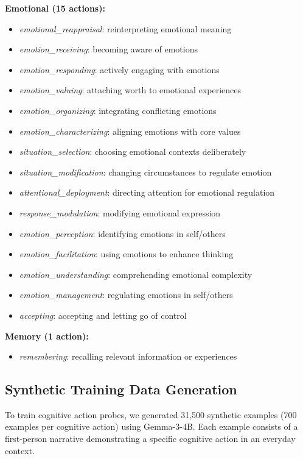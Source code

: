 \documentclass[letterpaper]{article}
\begin{document}
\textbf{Emotional (15 actions):}
\begin{itemize}
    \item \textit{emotional\_reappraisal}: reinterpreting emotional meaning
    \item \textit{emotion\_receiving}: becoming aware of emotions
    \item \textit{emotion\_responding}: actively engaging with emotions
    \item \textit{emotion\_valuing}: attaching worth to emotional experiences
    \item \textit{emotion\_organizing}: integrating conflicting emotions
    \item \textit{emotion\_characterizing}: aligning emotions with core values
    \item \textit{situation\_selection}: choosing emotional contexts deliberately
    \item \textit{situation\_modification}: changing circumstances to regulate emotion
    \item \textit{attentional\_deployment}: directing attention for emotional regulation
    \item \textit{response\_modulation}: modifying emotional expression
    \item \textit{emotion\_perception}: identifying emotions in self/others
    \item \textit{emotion\_facilitation}: using emotions to enhance thinking
    \item \textit{emotion\_understanding}: comprehending emotional complexity
    \item \textit{emotion\_management}: regulating emotions in self/others
    \item \textit{accepting}: accepting and letting go of control
\end{itemize}

\textbf{Memory (1 action):}
\begin{itemize}
    \item \textit{remembering}: recalling relevant information or experiences
\end{itemize}

\subsection{Synthetic Training Data Generation}

To train cognitive action probes, we generated 31,500 synthetic examples (700 examples per cognitive action) using Gemma-3-4B. Each example consists of a first-person narrative demonstrating a specific cognitive action in an everyday context.
\end{document}
